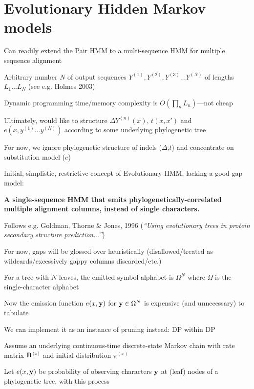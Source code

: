 \documentclass{beamer}
\begin{document}
\section{Evolutionary Hidden Markov models}
\label{sec:EvolutionaryHMM}

\begin{frame}{}

\itemb
\item Can readily extend the Pair HMM to a multi-sequence HMM for multiple sequence alignment
 \itemb
 \item Arbitrary number $N$ of output sequences $Y^{(1)}, Y^{(2)}, Y^{(3)} \ldots Y^{(N)}$ of lengths $L_1 \ldots L_N$ (see e.g. Holmes 2003)
 \item Dynamic programming time/memory complexity is $O(\prod_n L_n)$---not cheap
 \item Ultimately, would like to structure $\Delta Y^{(n)}(x)$, $t(x,x')$ and $e(x,y^{(1)} \ldots y^{(N)})$ according to some underlying phylogenetic tree
 \item For now, we ignore phylogenetic structure of indels ($\Delta$,$t$) and concentrate on substitution model ($e$)
 \iteme
\item Initial, simplistic, restrictive concept of Evolutionary HMM, lacking a good gap model:
 \itemb
 \item {\bf A single-sequence HMM that emits phylogenetically-correlated multiple alignment columns, instead of single characters.}
 \item Follows e.g. Goldman, Thorne \& Jones, 1996 ({\em ``Using evolutionary trees in protein secondary structure prediction...''})
 \item For now, gaps will be glossed over heuristically (disallowed/treated as wildcards/excessively gappy columns discarded/etc.)
 \iteme
\item For a tree with $N$ leaves, the emitted symbol alphabet is $\Omega^N$ where $\Omega$ is the single-character alphabet
\item Now the emission function $e(x,{\bf y)}$ for ${\bf y} \in \Omega^N$ is expensive (and unnecessary) to tabulate
 \itemb
 \item We can implement it as an instance of pruning instead: DP within DP
 \item Assume an underlying continuous-time discrete-state Markov chain with rate matrix ${\bf R}^{(x)}$ and initial distribution $\pi^{(x)}$
 \item Let $e(x,{\bf y})$ be probability of observing characters ${\bf y}$ at (leaf) nodes of a phylogenetic tree, with this process

\end{frame}
\end{document}
